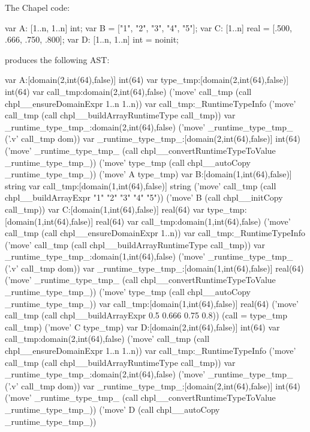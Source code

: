 The Chapel code:
\begin{chapel}
  var A: [1..n, 1..n] int;
  var B = ["1", "2", "3", "4", "5"];
  var C: [1..n] real = [.500, .666, .750, .800];
  var D: [1..n, 1..n] int = noinit;
\end{chapel}
produces the following AST:
\begin{numberedchapel}
    var A:[domain(2,int(64),false)] int(64)
    {
      var type_tmp:[domain(2,int(64),false)] int(64)
      var call_tmp:domain(2,int(64),false)
      ('move' call_tmp (call chpl__ensureDomainExpr 1..n 1..n))
      var call_tmp:_RuntimeTypeInfo
      ('move' call_tmp (call chpl__buildArrayRuntimeType call_tmp))
      var _runtime_type_tmp_:domain(2,int(64),false)
      ('move' _runtime_type_tmp_ ('.v' call_tmp dom))
      var _runtime_type_tmp_:[domain(2,int(64),false)] int(64)
      ('move' _runtime_type_tmp_ (call chpl__convertRuntimeTypeToValue _runtime_type_tmp_))
      ('move' type_tmp (call chpl__autoCopy _runtime_type_tmp_))
      ('move' A type_tmp)
    }
    var B:[domain(1,int(64),false)] string
    var call_tmp:[domain(1,int(64),false)] string
    ('move' call_tmp (call chpl__buildArrayExpr "1" "2" "3" "4" "5"))
    ('move' B (call chpl__initCopy call_tmp))
    var C:[domain(1,int(64),false)] real(64)
    {
      var type_tmp:[domain(1,int(64),false)] real(64)
      var call_tmp:domain(1,int(64),false)
      ('move' call_tmp (call chpl__ensureDomainExpr 1..n))
      var call_tmp:_RuntimeTypeInfo
      ('move' call_tmp (call chpl__buildArrayRuntimeType call_tmp))
      var _runtime_type_tmp_:domain(1,int(64),false)
      ('move' _runtime_type_tmp_ ('.v' call_tmp dom))
      var _runtime_type_tmp_:[domain(1,int(64),false)] real(64)
      ('move' _runtime_type_tmp_ (call chpl__convertRuntimeTypeToValue _runtime_type_tmp_))
      ('move' type_tmp (call chpl__autoCopy _runtime_type_tmp_))
      var call_tmp:[domain(1,int(64),false)] real(64)
      ('move' call_tmp (call chpl__buildArrayExpr 0.5 0.666 0.75 0.8))
      (call = type_tmp call_tmp)
      ('move' C type_tmp)
    }
    var D:[domain(2,int(64),false)] int(64)
    var call_tmp:domain(2,int(64),false)
    ('move' call_tmp (call chpl__ensureDomainExpr 1..n 1..n))
    var call_tmp:_RuntimeTypeInfo
    ('move' call_tmp (call chpl__buildArrayRuntimeType call_tmp))
    var _runtime_type_tmp_:domain(2,int(64),false)
    ('move' _runtime_type_tmp_ ('.v' call_tmp dom))
    var _runtime_type_tmp_:[domain(2,int(64),false)] int(64)
    ('move' _runtime_type_tmp_ (call chpl__convertRuntimeTypeToValue _runtime_type_tmp_))
    ('move' D (call chpl__autoCopy _runtime_type_tmp_))
\end{numberedchapel}

